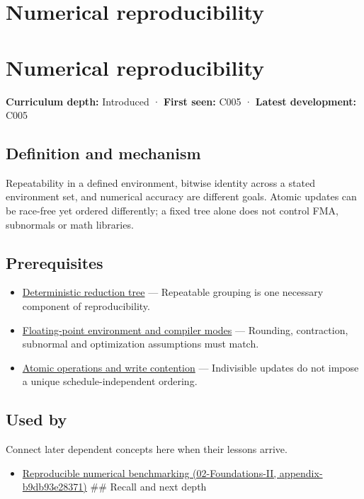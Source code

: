 \hypertarget{appendix-5f1a2c3f97ff}{}
\section*{Numerical reproducibility}
\section{Numerical reproducibility}\label{numerical-reproducibility}

\textbf{Curriculum depth:} Introduced · \textbf{First seen:} C005 · \textbf{Latest development:} C005

\subsection{Definition and mechanism}\label{definition-and-mechanism}

Repeatability in a defined environment, bitwise identity across a stated environment set, and numerical accuracy are different goals. Atomic updates can be race-free yet ordered differently; a fixed tree alone does not control FMA, subnormals or math libraries.

\subsection{Prerequisites}\label{prerequisites}

\begin{itemize}
\tightlist
\item
  \hyperref[appendix-4c8e0238e7ee]{Deterministic reduction tree} --- Repeatable grouping is one necessary component of reproducibility.
\item
  \hyperref[appendix-f11d1a521253]{Floating-point environment and compiler modes} --- Rounding, contraction, subnormal and optimization assumptions must match.
\item
  \hyperref[appendix-e12d1b03fefb]{Atomic operations and write contention} --- Indivisible updates do not impose a unique schedule-independent ordering.
\end{itemize}

\subsection{Used by}\label{used-by}

Connect later dependent concepts here when their lessons arrive.

\begin{itemize}
\tightlist
\item
  \href{}{Reproducible numerical benchmarking (02-Foundations-II, appendix-b9db93e28371)} \#\# Recall and next depth
\end{itemize}

